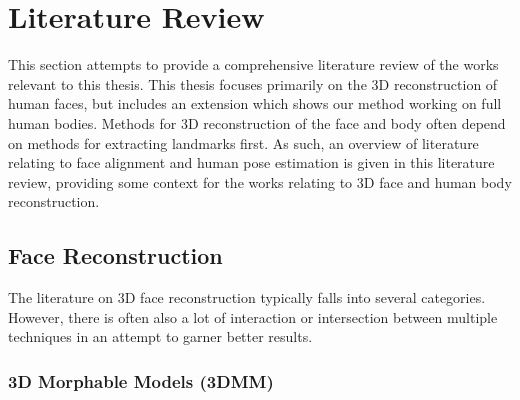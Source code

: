 \chapter{Literature Review}
\label{chapter:literature}

This section attempts to provide a comprehensive literature review of
the works relevant to this thesis. This thesis focuses primarily on
the 3D reconstruction of human faces, but includes an extension which
shows our method working on full human bodies. Methods for 3D
reconstruction of the face and body often depend on methods for
extracting landmarks first. As such, an overview of literature
relating to face alignment and human pose estimation is given in this
literature review, providing some context for the works relating to 3D
face and human body reconstruction.


\section{Face Reconstruction}
\label{chap:literature:sec:face_recon}


The literature on 3D face reconstruction typically falls into several
categories. However, there is often also a lot of interaction or
intersection between multiple techniques in an attempt to garner
better results.

\subsection{3D Morphable Models (3DMM)}

